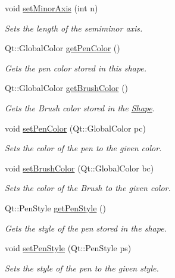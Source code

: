 \begin{DoxyCompactItemize}
void \hyperlink{classEllipse_ac0bd465b71501780ba71e2c4b1942100}{set\+Minor\+Axis} (int n)
\begin{DoxyCompactList}\small\item\em Sets the length of the semiminor axis. \end{DoxyCompactList}\item 
Qt\+::\+Global\+Color \hyperlink{classEllipse_a695959f0218a53af7758d671189ce558}{get\+Pen\+Color} ()
\begin{DoxyCompactList}\small\item\em Gets the pen color stored in this shape. \end{DoxyCompactList}\item 
Qt\+::\+Global\+Color \hyperlink{classEllipse_ad170f1cfd8af739d7202144b92a25861}{get\+Brush\+Color} ()
\begin{DoxyCompactList}\small\item\em Gets the Brush color stored in the \hyperlink{classShape}{Shape}. \end{DoxyCompactList}\item 
void \hyperlink{classEllipse_a764a1e1ea8fb7db3fca39cf36a8fec35}{set\+Pen\+Color} (Qt\+::\+Global\+Color pc)
\begin{DoxyCompactList}\small\item\em Sets the color of the pen to the given color. \end{DoxyCompactList}\item 
void \hyperlink{classEllipse_a504988b087ad3619c764469ee5506025}{set\+Brush\+Color} (Qt\+::\+Global\+Color bc)
\begin{DoxyCompactList}\small\item\em Sets the color of the Brush to the given color. \end{DoxyCompactList}\item 
Qt\+::\+Pen\+Style \hyperlink{classEllipse_ad62330c89dd6f3ebc7e08378aebf6518}{get\+Pen\+Style} ()
\begin{DoxyCompactList}\small\item\em Gets the style of the pen stored in the shape. \end{DoxyCompactList}\item 
void \hyperlink{classEllipse_ae96699413a5bef290c19a552ab7271d9}{set\+Pen\+Style} (Qt\+::\+Pen\+Style ps)
\begin{DoxyCompactList}\small\item\em Sets the style of the pen to the given style. \end{DoxyCompactList}\item 

\end{DoxyCompactItemize}
